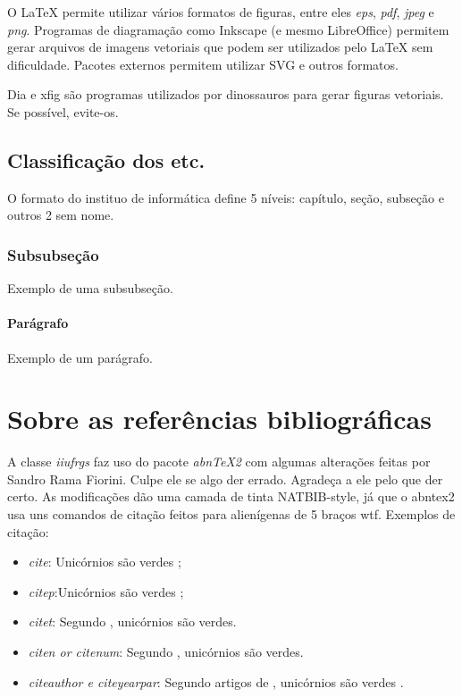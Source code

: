 \documentclass[ecp,tc]{iiufrgs}
\begin{document}
O LaTeX permite utilizar vários formatos de figuras, entre eles \emph{eps}, \emph{pdf}, \emph{jpeg} e \emph{png}. Programas de diagramação como Inkscape (e mesmo LibreOffice) permitem gerar arquivos de imagens vetoriais que podem ser utilizados pelo LaTeX sem dificuldade. Pacotes externos permitem utilizar SVG e outros formatos.

Dia e xfig são programas utilizados por dinossauros para gerar figuras vetoriais. Se possível, evite-os.

\subsection{Classificação dos etc.}

O formato do instituo de informática define 5 níveis: capítulo, seção, subseção e outros 2 sem nome.

\subsubsection{Subsubseção}
Exemplo de uma subsubseção.

\paragraph{Parágrafo}
Exemplo de um parágrafo.

\section{Sobre as referências bibliográficas}

A classe \emph{iiufrgs} faz uso do pacote \emph{abnTeX2} com algumas alterações
feitas por Sandro Rama Fiorini. Culpe ele se algo der errado. Agradeça a ele
pelo que der certo. As modificações dão uma camada de tinta NATBIB-style,
já que o abntex2 usa uns comandos de citação feitos para alienígenas de 5 braços
wtf. Exemplos de citação:

\begin{itemize}
    \item \emph{cite}: Unicórnios são verdes \cite{Adams2009Conceptual};
    \item \emph{citep}:Unicórnios são verdes \citep{Adams2009Conceptual};
    \item \emph{citet}: Segundo \citet{Adams2009Conceptual}, unicórnios são
    verdes.
    \item \emph{citen or citenum}: Segundo ,
    unicórnios são verdes.
    \item \emph{citeauthor e citeyearpar}: Segundo artigos de
    \citeauthor{Adams2009Conceptual} , unicórnios são verdes
    \citeyearpar{Adams2009Conceptual}.

\end{itemize}
\end{document}
